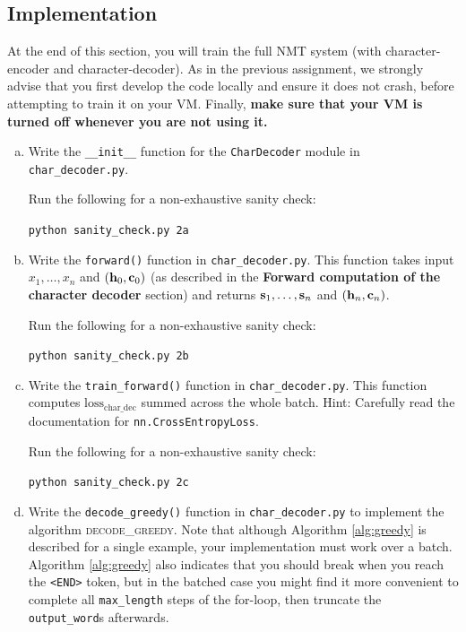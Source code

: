 \subsection*{Implementation}
At the end of this section, you will train the full NMT system (with character-encoder and character-decoder). 
As in the previous assignment, we strongly advise that you first develop the code locally and ensure it does not crash, before attempting to train it on your VM.
Finally, \textbf{make sure that your VM is turned off whenever you are not using it.}
\begin{enumerate}[(a)]
    \item {} Write the \texttt{\_\_init\_\_} function for the \texttt{CharDecoder} module in \texttt{char\_decoder.py}.
    
    Run the following for a non-exhaustive sanity check:
    \begin{center}
        \texttt{python sanity\_check.py 2a}
    \end{center}

    \item {} Write the \texttt{forward()}  function in \texttt{char\_decoder.py}. This function takes input $x_1,\dots,x_n$ and $(\mathbf{h}_0, \mathbf{c}_0)$ (as described in the \textbf{Forward computation of the character decoder} section) and returns $\mathbf{s}_1,\dots,\mathbf{s}_n$ and $(\mathbf{h}_n, \mathbf{c}_n)$.

    Run the following for a non-exhaustive sanity check:
    \begin{center}
        \texttt{python sanity\_check.py 2b}
    \end{center}

    \item {} Write the \texttt{train\_forward()} function in \texttt{char\_decoder.py}. This function computes $\text{loss}_\text{char\_dec}$ summed across the whole batch. Hint: Carefully read the documentation for \texttt{nn.CrossEntropyLoss}.

    Run the following for a non-exhaustive sanity check:
    \begin{center}
        \texttt{python sanity\_check.py 2c}
    \end{center}

    \item {} Write the \texttt{decode\_greedy()} function in \texttt{char\_decoder.py} to implement the algorithm \textsc{decode\_greedy}. 
    Note that although Algorithm \ref{alg:greedy} is described for a single example, your implementation must work over a batch.
    Algorithm \ref{alg:greedy} also indicates that you should break when you reach the \texttt{<END>} token, but in the batched case you might find it more convenient to complete all \texttt{max\_length} steps of the for-loop, then truncate the \texttt{output\_word}s afterwards.


\end{enumerate}
